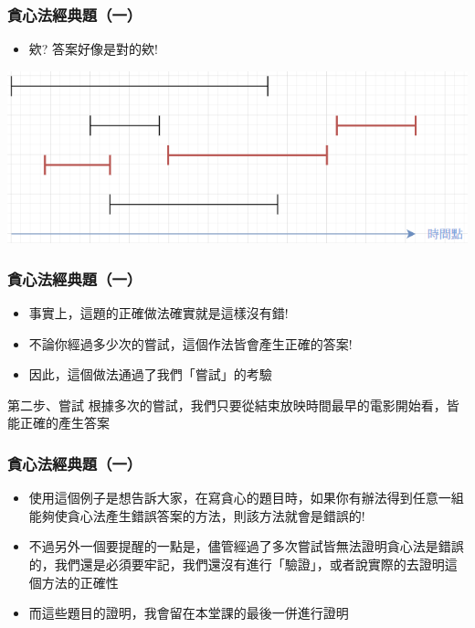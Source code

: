 \documentclass[aspectratio=169]{beamer}
\begin{document}
\begin{frame}
\frametitle{貪心法經典題（一）}
    \begin{itemize}
    \item<1-> 欸? 答案好像是對的欸!
    \end{itemize}
    \begin{center}
        \includegraphics[scale=0.75]{images/movie_festival_5.png}
    \end{center}
\end{frame}

\begin{frame}
\frametitle{貪心法經典題（一）}
    \begin{itemize}
    \item<1-> 事實上，這題的正確做法確實就是這樣沒有錯! \pause
    \item<2-> 不論你經過多少次的嘗試，這個作法皆會產生正確的答案! \pause
    \item<3-> 因此，這個做法通過了我們「嘗試」的考驗 \pause
    \end{itemize} 
    
    \begin{alertblock}{第二步、嘗試}
        根據多次的嘗試，我們只要從結束放映時間最早的電影開始看，皆能正確的產生答案
    \end{alertblock}
\end{frame}

\begin{frame}
\frametitle{貪心法經典題（一）}
    \begin{itemize}
    \item<1-> 使用這個例子是想告訴大家，在寫貪心的題目時，如果你有辦法得到任意一組能夠使貪心法產生錯誤答案的方法，則該方法就會是錯誤的!
    \item<2-> 不過另外一個要提醒的一點是，儘管經過了多次嘗試皆無法證明貪心法是錯誤的，我們還是必須要牢記，我們還沒有進行「驗證」，或者說實際的去證明這個方法的正確性
    \item<2-> 而這些題目的證明，我會留在本堂課的最後一併進行證明
    \end{itemize}
\end{frame}
\end{document}
